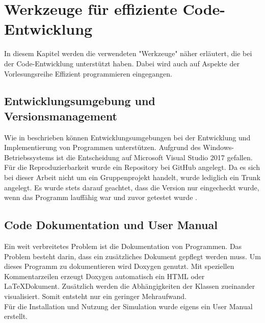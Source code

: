 \chapter{Werkzeuge für effiziente Code-Entwicklung}
In diesem Kapitel werden die verwendeten "Werkzeuge" näher erläutert, die bei der Code-Entwicklung unterstützt haben. Dabei wird auch auf Aspekte der Vorlesungsreihe Effizient programmieren \cite{Kessler.Sommersemester2017} eingegangen.

\section{Entwicklungsumgebung und Versionsmanagement}
Wie in \cite{Kessler.Sommersemester2017} beschrieben können Entwicklungsumgebungen bei der Entwicklung und Implementierung von Programmen unterstützen. Aufgrund des Windows-Betriebssystems ist die Entscheidung auf  Microsoft Visual Studio 2017 gefallen. Für die Reproduzierbarkeit wurde ein Repository bei GitHub angelegt. Da es sich bei dieser Arbeit nicht um ein Gruppenprojekt handelt, wurde lediglich ein Trunk angelegt. Es wurde stets darauf geachtet, dass die Version nur eingecheckt wurde, wenn das Programm lauffähig war und zuvor getestet wurde \cite{Kessler.Sommersemester2017}.  
\section{Code Dokumentation und User Manual}
Ein weit verbreitetes Problem ist die Dokumentation von Programmen. Das Problem besteht darin, dass ein zusätzliches Dokument gepflegt werden muss. Um dieses Programm zu dokumentieren wird Doxygen genutzt. Mit speziellen Kommentarzeilen erzeugt Doxygen automatisch ein HTML oder \LaTeX Dokument. Zusätzlich werden die Abhängigkeiten der Klassen zueinander visualisiert. Somit entsteht nur ein geringer Mehraufwand. \\
Für die Installation und Nutzung der Simulation wurde eigens ein User Manual erstellt.
\newpage
